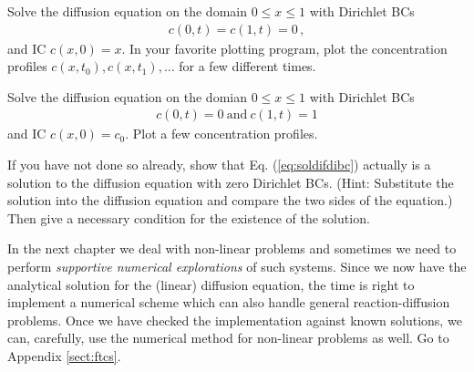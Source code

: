 \begin{exerciseregion}

	\begin{exercise}
		Solve the diffusion equation on the domain $0 \leq x \leq 1$ with Dirichlet BCs 
		\begin{eqnarray}
			c(0,t)=c(1,t)=0 \, ,
		\end{eqnarray}
		and IC $c(x,0)=x$. In your favorite plotting program, 
		plot the concentration profiles $c(x,t_0), c(x,t_1), \ldots$ for a few different 
		times. 
	\end{exercise}	

	\begin{exercise}
		Solve the diffusion equation on the domian $0 \leq x \leq 1$ with Dirichlet BCs
		\begin{eqnarray}
			c(0,t)=0 \ \text{and} \ c(1,t)=1
		\end{eqnarray}
		and IC $c(x, 0)= c_0.$ Plot a few concentration profiles.
	\end{exercise}

	\begin{exercise}
		If you have not done so already, show that Eq. (\ref{eq:soldifdibc})
		actually is a solution to the diffusion equation
		with zero Dirichlet BCs. (Hint: Substitute the solution into the
		diffusion equation and compare the two sides of the equation.)
		Then give a necessary condition for the existence of the solution. 
	\end{exercise}

	\begin{exploration}
		\label{exercise:numerics}
		In the next chapter we deal with non-linear problems and sometimes we need to  
		perform \emph{supportive numerical explorations} of such systems.  
		Since we now have the analytical solution for the (linear) diffusion equation, the time is right 
		to implement a numerical scheme which can also handle general reaction-diffusion problems. 
		Once we have checked the implementation against known solutions, we can,  
		carefully, use the numerical method for non-linear problems as well. Go to Appendix \ref{sect:ftcs}.
	\end{exploration}


\end{exerciseregion}
